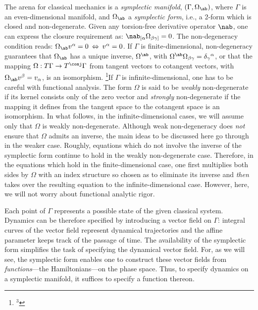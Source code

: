 The arena for classical mechanics is a {\it symplectic manifold}, $(\Gamma,
\Omega_\ab)$, where $\Gamma$ is an even-dimensional manifold, and $\Omega_\ab$
a {\it symplectic form}, i.e., a 2-form which is closed and non-degenerate.
Given any torsion-free derivative operator $\nab $, one can express the closure
requirement as:  $\nab_{[\alpha}\Omega_{\beta\gamma]}=0$. The non-degeneracy
condition reads: $\Omega_\ab v^\alpha=0\>\Leftrightarrow\> v^\alpha=0$. If
$\Gamma$ is finite-dimensional, non-degeneracy guarantees that $\Omega_\ab$ has
a unique inverse, $\Omega^\ab$, with $\Omega^\ab\Omega_{\beta\gamma}=
\delta_\gamma{}^\alpha$, or that the mapping $\Omega: T\Gamma\to T^\conj
\Gamma$ from tangent vectors to cotangent vectors, with $\Omega_\ab v^\beta
=v_\alpha$, is an isomorphism.
   \footnote{$^3$}{If $\Gamma$ is infinite-dimensional, one has to be careful
   with functional analysis. The form $\Omega$ is said to be {\it weakly}
   non-degenerate if its kernel consists only of the zero vector and
   {\it strongly} non-degenerate if the mapping it defines from the tangent
   space to the cotangent space is an isomorphism. In what follows, in the
   infinite-dimensional cases, we will assume only that $\Omega$ is weakly
   non-degenerate. Although weak non-degeneracy does {\it not} ensure that
   $\Omega$ admits an inverse, the main ideas to be discussed here
   go through in the weaker case. Roughly, equations which do not
   involve the inverse of the symplectic form continue to hold in the weakly
   non-degenerate case. Therefore, in the equations which hold in the
   finite-dimensional case, one first multiplies both sides by $\Omega$ with
   an index structure so chosen as to eliminate its inverse and {\it then}
   takes over the resulting equation to the infinite-dimensional case.
   However, here, we will not worry about functional analytic rigor.}

Each point of $\Gamma$ represents a possible state of the given classical
system. Dynamics can be therefore specified by introducing a vector field on
$\Gamma$: integral curves of the vector field represent dynamical trajectories
and the affine parameter keeps track of the passage of time. The availability
of
the symplectic form simplifies the task of specifying the dynamical vector
field. For, as we will see, the symplectic form enables one to construct
these vector fields from {\it functions}---the Hamiltonians---on the phase
space. Thus, to specify dynamics on a symplectic manifold, it suffices to
specify a function thereon.

